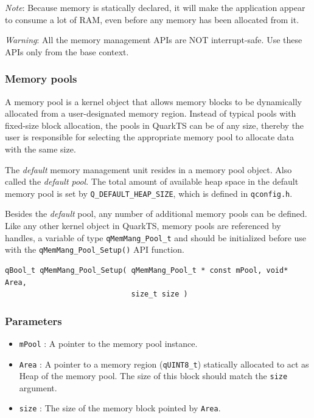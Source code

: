 \documentclass{article}
\begin{document}
\begin{tcolorbox}
\ArrowBoldDownRight \textit{Note}: Because memory is statically declared, it will make the application appear to consume a lot of RAM, even before any memory has been allocated from it.
\end{tcolorbox}

\begin{tcolorbox}
\AsteriskBold \textit{Warning}: All the memory management APIs are NOT interrupt-safe. Use these APIs only from the base context.
\end{tcolorbox}

\subsubsection{Memory pools}

A memory pool is a kernel object that allows memory blocks to be dynamically allocated from a user-designated memory region. Instead of typical pools with fixed-size block allocation, the pools in QuarkTS can be of any size, thereby the user is responsible for selecting the appropriate memory pool to allocate data with the same size. 

The \textit{default} memory management unit resides in a memory pool object. Also called the \textit{default pool}. The total amount of available heap space in the default memory pool is set by \lstinline{Q_DEFAULT_HEAP_SIZE}, which is defined in \lstinline{qconfig.h}.

Besides the \textit{default} pool, any number of additional memory pools can be defined. Like any other kernel object in QuarkTS, memory pools are referenced by handles, a variable of type \lstinline{qMemMang_Pool_t}  and should be initialized before use with the \lstinline{qMemMang_Pool_Setup()}  API function. \\

\begin{lstlisting}[style=CStyle]
qBool_t qMemMang_Pool_Setup( qMemMang_Pool_t * const mPool, void* Area, 
                             size_t size )
\end{lstlisting}

\subsubsection*{Parameters}
\begin{itemize}
    \item \lstinline{mPool} : A pointer to the memory pool instance. 
    \item \lstinline{Area} :  A pointer to a memory region (\lstinline{qUINT8_t}) statically allocated to act as Heap of the memory pool. The size of this block should match the \lstinline{size} argument.
    \item \lstinline{size} : The size of the memory block pointed by \lstinline{Area}. 
\end{itemize}
\end{document}
